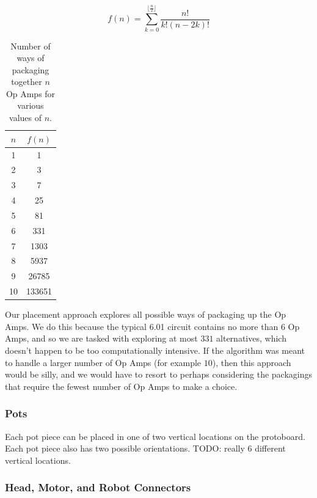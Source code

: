 \begin{equation}
f(n) = \sum\limits_{k=0}^{\lfloor\frac{n}{2}\rfloor}{\frac{n!}{k!(n - 2k)!}}
\label{eq:opamp}
\end{equation}

\begin{table}
\begin{center}
\begin{singlespace}
\begin{tabular}{c | c}
$n$ & $f(n)$ \\
\hline
\hline
1 & 1 \\
2 & 3 \\
3 & 7 \\
4 & 25 \\
5 & 81 \\
6 & 331 \\
7 & 1303 \\
8 & 5937 \\
9 & 26785 \\
10 & 133651
\end{tabular}
\end{singlespace}
\end{center}
\label{tb:opamp}
\caption{Number of ways of packaging together $n$ Op Amps for various values of
$n$.}
\end{table}

Our placement approach explores all possible ways
of packaging up the Op Amps. We do this because the typical 6.01 circuit contains
no more than $6$ Op Amps, and so we are tasked with exploring at most $331$
alternatives, which doesn't happen to be too computationally intensive. If the
algorithm was meant to handle a larger number of Op Amps (for example $10$), then
this approach would be silly, and we would have to resort to perhaps considering
the packagings that require the fewest number of Op Amps to make a choice.

\subsubsection{Pots}

Each pot piece can be placed in one of two vertical locations on the protoboard.
Each pot piece also has two possible orientations. TODO: really 6 different
vertical locations.

\subsubsection{Head, Motor, and Robot Connectors}

